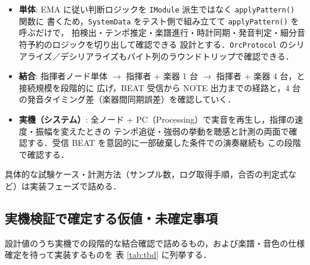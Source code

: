 \documentclass[lualatex,book,paper=a4paper,jafontsize=11.5pt,jafontscale=1.05]{jlreq}
\begin{document}
\begin{itemize}
  \item \textbf{単体}: EMA に従い判断ロジックを \texttt{IModule} 派生ではなく \texttt{applyPattern()} 関数に
        書くため，\texttt{SystemData} をテスト側で組み立てて \texttt{applyPattern()} を呼ぶだけで，
        拍検出・テンポ推定・楽譜進行・時計同期・発音判定・細分音符予約のロジックを切り出して確認できる
        設計とする．\texttt{OrcProtocol} のシリアライズ／デシリアライズもバイト列のラウンドトリップで確認できる．
  \item \textbf{結合}: 指揮者ノード単体 $\to$ 指揮者 + 楽器 1 台 $\to$ 指揮者 + 楽器 4 台，と接続規模を段階的に
        広げ，BEAT 受信から NOTE 出力までの経路と，4 台の発音タイミング差（楽器間同期誤差）を確認していく．
  \item \textbf{実機（システム）}: 全ノード + PC（Processing）で実音を再生し，指揮の速度・振幅を変えたときの
        テンポ追従・強弱の挙動を聴感と計測の両面で確認する．受信 BEAT を意図的に一部破棄した条件での演奏継続も
        この段階で確認する．
\end{itemize}

具体的な試験ケース・計測方法（サンプル数，ログ取得手順，合否の判定式など）は実装フェーズで詰める．

\subsection{実機検証で確定する仮値・未確定事項}\label{subsec:tbd}

設計値のうち実機での段階的な結合確認で詰めるもの，および楽譜・音色の仕様確定を待って実装するものを
表 \ref{tab:tbd} に列挙する．
\end{document}

